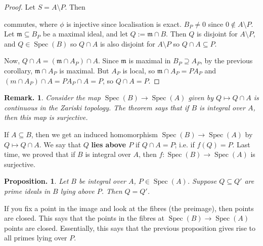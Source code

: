 \documentclass[11pt, a4paper]{memoir}
\theoremstyle{change}
\newtheorem{proposition}[theorem]{Proposition.}
\theoremstyle{plain}
\theoremstyle{nonumberplain}
\newtheorem{remark}{Remark.}
\newtheorem{proof}{Proof}
\DeclareMathOperator{\Spec}{Spec}
\numberwithin{equation}{section}
\begin{document}
\begin{proof}
    Let $S=A\setminus P$.
    Then
    \begin{center}
    \end{center}
    commutes, where $\phi$ is injective since localisation is exact.
    $B_P\neq 0$ since $0\notin A\setminus P$.
    Let $\mathfrak{m}\subseteq B_P$ be a maximal ideal, and let $Q:=\mathfrak{m}\cap B$.
    Then $Q$ is disjoint for $A\setminus P$, and $Q\in\Spec(B)$ so $Q\cap A$ is also disjoint for $A\setminus P$ so $Q\cap A\subseteq P$.

    Now, $Q\cap A=(\mathfrak{m}\cap A_P)\cap A$.
    Since $\mathfrak{m}$ is maximal in $B_P\supseteq A_P$, by the previous corollary, $\mathfrak{m}\cap A_P$ is maximal.
    But $A_P$ is local, so $\mathfrak{m}\cap A_P=PA_P$ and $(m\cap A_P)\cap A=PA_P\cap A=P$, so $Q\cap A=P$.
\end{proof}
\begin{remark}
    Consider the map $\Spec(B)\to\Spec(A)$ given by $Q\mapsto Q\cap A$ is continuous in the Zariski topology.
    The theorem says that if $B$ is integral over $A$, then this map is surjective.
\end{remark}
If $A\subseteq B$, then we get an induced homomorphism $\Spec(B)\to\Spec(A)$ by $Q\mapsto Q\cap A$.
We say that $Q$ \textbf{lies above $P$} if $Q\cap A=P$; i.e. if $f(Q)=P$.
Last time, we proved that if $B$ is integral over $A$, then $f:\Spec(B)\to\Spec(A)$ is surjective.
\begin{proposition}
    Let $B$ be integral over $A$, $P\in\Spec(A)$.
    Suppose $Q\subseteq Q'$ are prime ideals in $B$ lying above $P$.
    Then $Q=Q'$.
\end{proposition}
If you fix a point in the image and look at the fibres (the preimage), then points are closed.
This says that the points in the fibres at $\Spec(B)\to\Spec(A)$ points are closed.
Essentially, this says that the previous proposition gives rise to all primes lying over $P$.
\end{document}
